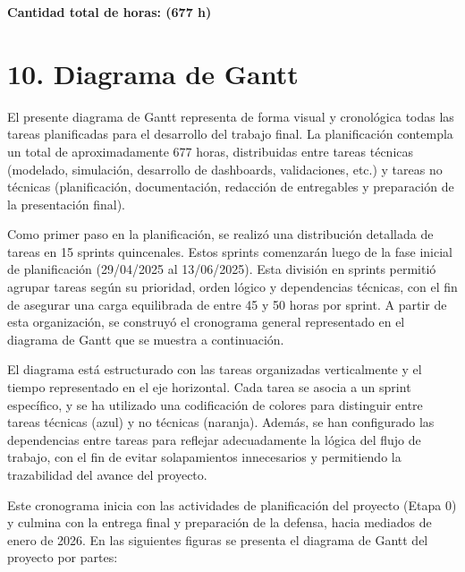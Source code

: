 \documentclass[
11pt, %
]{charter}
\begin{document}
\vspace{0.5cm}
\noindent
\textbf{Cantidad total de horas: (677 h)}

\vspace{0.2cm}
\noindent\dotfill

\section{10. Diagrama de Gantt}
\label{sec:gantt}

El presente diagrama de Gantt representa de forma visual y cronológica todas las tareas planificadas para el desarrollo del trabajo final. La planificación contempla un total de aproximadamente 677 horas, distribuidas entre tareas técnicas (modelado, simulación, desarrollo de dashboards, validaciones, etc.) y tareas no técnicas (planificación, documentación, redacción de entregables y preparación de la presentación final).

Como primer paso en la planificación, se realizó una distribución detallada de tareas en 15 sprints quincenales. Estos sprints comenzarán luego de la fase inicial de planificación (29/04/2025 al 13/06/2025). Esta división en sprints permitió agrupar tareas según su prioridad, orden lógico y dependencias técnicas, con el fin de asegurar una carga equilibrada de entre 45 y 50 horas por sprint. A partir de esta organización, se construyó el cronograma general representado en el diagrama de Gantt que se muestra a continuación.

El diagrama está estructurado con las tareas organizadas verticalmente y el tiempo representado en el eje horizontal. Cada tarea se asocia a un sprint específico, y se ha utilizado una codificación de colores para distinguir entre tareas técnicas (azul) y no técnicas (naranja). Además, se han configurado las dependencias entre tareas para reflejar adecuadamente la lógica del flujo de trabajo, con el fin de evitar solapamientos innecesarios y permitiendo la trazabilidad del avance del proyecto.

Este cronograma inicia con las actividades de planificación del proyecto (Etapa 0) y culmina con la entrega final y preparación de la defensa, hacia mediados de enero de 2026. En las siguientes figuras se presenta el diagrama de Gantt del proyecto por partes:
\end{document}
